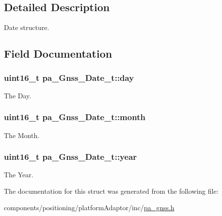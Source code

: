 \subsection{Detailed Description}
Date structure. 

\subsection{Field Documentation}
\subsubsection[{\texorpdfstring{day}{day}}]{\setlength{\rightskip}{0pt plus 5cm}uint16\+\_\+t pa\+\_\+\+Gnss\+\_\+\+Date\+\_\+t\+::day}\hypertarget{structpa___gnss___date__t_a920fe496fac81fdd87202ac0ddd216b2}{}\label{structpa___gnss___date__t_a920fe496fac81fdd87202ac0ddd216b2}


The Day. 

\subsubsection[{\texorpdfstring{month}{month}}]{\setlength{\rightskip}{0pt plus 5cm}uint16\+\_\+t pa\+\_\+\+Gnss\+\_\+\+Date\+\_\+t\+::month}\hypertarget{structpa___gnss___date__t_ae538279bffa94e12dc7d64b45f598093}{}\label{structpa___gnss___date__t_ae538279bffa94e12dc7d64b45f598093}


The Month. 

\subsubsection[{\texorpdfstring{year}{year}}]{\setlength{\rightskip}{0pt plus 5cm}uint16\+\_\+t pa\+\_\+\+Gnss\+\_\+\+Date\+\_\+t\+::year}\hypertarget{structpa___gnss___date__t_a2ac238d314385481e396a2acab852281}{}\label{structpa___gnss___date__t_a2ac238d314385481e396a2acab852281}


The Year. 



The documentation for this struct was generated from the following file\+:\begin{DoxyCompactItemize}
\item 
components/positioning/platform\+Adaptor/inc/\hyperlink{pa__gnss_8h}{pa\+\_\+gnss.\+h}\end{DoxyCompactItemize}

